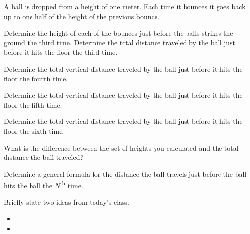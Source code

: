 \begin{problem}
\item A ball is dropped from a height of one meter. Each time it bounces it goes
  back up to one half of the height of the previous bounce.
  \begin{subproblem}
  \item Determine the height of each of the bounces just before the balls strikes
        the ground the third time. Determine the total distance traveled by the ball
        just before it hits the floor the third time.
    \vfill
  \item Determine the total vertical distance traveled by the ball
    just before it hits the floor the fourth time.
    \vfill
  \item Determine the total vertical distance traveled by the ball
    just before it hits the floor the fifth time.
    \vfill
  \item Determine the total vertical distance traveled by the ball
    just before it hits the floor the sixth time.
    \vfill
  \end{subproblem}

  \clearpage

  \item What is the difference between the set of heights you calculated and the
    total distance the ball traveled?

    \vfill

  \item Determine a general formula for the distance the ball travels just before
    the ball hits the ball the $N$\textsuperscript{th} time.

    \vfill

\end{problem}

\postClass

\begin{problem}
\item Briefly state two ideas from today's class.
  \begin{itemize}
  \item
  \item
  \end{itemize}
\item
  \begin{subproblem}
    \item
  \end{subproblem}
\end{problem}



